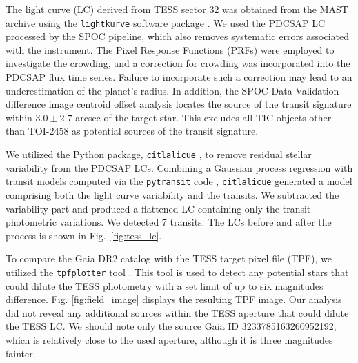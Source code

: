 \documentclass[traditabstract,longauth]{aa}
\begin{document}
The light curve (LC) derived from TESS sector 32 was obtained from the MAST archive using the {\tt lightkurve} software package \citep{Lightkurve18}. We used the PDCSAP LC \citep{Smith12, Stumpe2012, Stumpe2014} processed by the SPOC pipeline, which also removes systematic errors associated with the instrument. The Pixel Response Functions (PRFs) were employed to investigate the crowding, and a correction for crowding was incorporated into the PDCSAP flux time series. Failure to incorporate such a correction may lead to an underestimation of the planet's radius. In addition, the SPOC Data Validation difference image centroid offset analysis \citep{Twicken18} locates the source of the transit signature within $3.0\pm2.7$ arcsec of the target star. This excludes all TIC objects other than TOI-2458 as potential sources of the transit signature.

We utilized the Python package, {\tt citlalicue} \citep{Barragan22}, to remove residual stellar variability from the PDCSAP LCs. Combining a Gaussian process regression with transit models computed via the {\tt pytransit} code \citep{Parviainen15}, {\tt citlalicue} generated a model comprising both the light curve variability and the transits. We subtracted the variability part and produced a flattened LC containing only the transit photometric variations. We detected 7 transits. The LCs before and after the process is shown in Fig.~\ref{fig:tess_lc}.

To compare the Gaia DR2 catalog with the TESS target pixel file (TPF), we utilized the {\tt tpfplotter} tool \citep{Aller20}. This tool is used to detect any potential stars that could dilute the TESS photometry with a set limit of up to six magnitudes difference. Fig. \ref{fig:field_image} displays the resulting TPF image. Our analysis did not reveal any additional sources within the TESS aperture that could dilute the TESS LC. We should note only the source Gaia ID 3233785163260952192, which is relatively close to the used aperture, although it is three magnitudes fainter.
\end{document}
